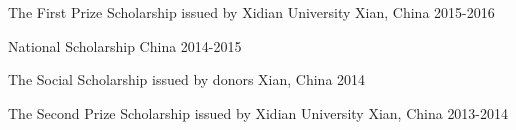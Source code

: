 


\begin{cvhonors}

  \cvhonor
    {The First Prize Scholarship} %
    { issued by Xidian University} %
    {Xian, China } %
    {2015-2016} %

  \cvhonor
    {National Scholarship} %
    {} %
    {China } %
    {2014-2015} %

  \cvhonor
    {The Social Scholarship} %
    {issued by donors} %
   {Xian, China } %
    {2014} %

  \cvhonor
    {The Second Prize Scholarship} %
	{issued by Xidian University}
    {Xian, China } %
    {2013-2014} %
    
\end{cvhonors}





